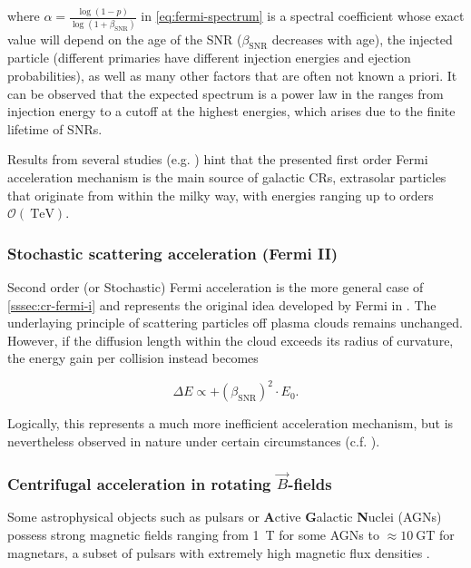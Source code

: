 where $\alpha = \frac{\log(1 - p)}{\log(1 + \beta_\text{SNR})}$ in \autoref{eq:fermi-spectrum} is a spectral coefficient whose exact value will depend on the age 
of the SNR ($\beta_\text{SNR}$ decreases with age), the injected particle (different primaries have different injection energies and ejection probabilities), as 
well as many other factors that are often not known a priori. It can be observed that the expected spectrum is a power law in the ranges from injection energy to a
cutoff at the highest energies, which arises due to the finite lifetime of SNRs.

Results from several studies (e.g. \cite{aab2015searches, hillas2005can, blasi2013origin}) hint that the presented first order Fermi acceleration mechanism is the 
main source of galactic CRs, extrasolar particles that originate from within the milky way, with energies ranging up to orders 
$\mathcal{O}(\SI{}{\tera\electronvolt})$.

\subsubsection{Stochastic scattering acceleration (Fermi II)}
\label{sssec:cr-fermi-ii}

Second order (or Stochastic) Fermi acceleration is the more general case of \autoref{sssec:cr-fermi-i} and represents the original idea developed by Fermi in 
\cite{fermi1949origin}. The underlaying principle of scattering particles off plasma clouds remains unchanged. However, if the diffusion length within the cloud 
exceeds its radius of curvature, the energy gain per collision instead becomes

\begin{equation}
\Delta E \propto + \left( \beta_\text{SNR}\right)^2 \cdot E_0.
\end{equation}

Logically, this represents a much more inefficient acceleration mechanism, but is nevertheless observed in nature under certain circumstances (c.f. 
\cite{asano2015most}).

\subsubsection{Centrifugal acceleration in rotating $\vec{B}$-fields}
\label{sssec:cr-centrifugal-acceleration}

Some astrophysical objects such as pulsars or \textbf{A}ctive \textbf{G}alactic \textbf{N}uclei (AGNs) possess strong magnetic fields ranging from \SI{1}{\tesla}
for some AGNs \cite{daly2019black} to $\approx\SI{10}{\giga\tesla}$ for magnetars, a subset of pulsars with extremely high magnetic flux densities 
\cite{flowers1977evolution}.

